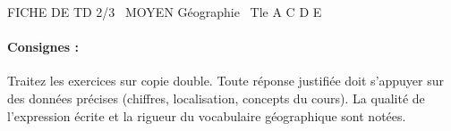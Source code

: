 \documentclass[11pt]{article}
\begin{document}
\begin{tcolorbox}[enhanced,colback=popink,colframe=popink,arc=10pt,boxrule=0pt,left=12pt,right=12pt,top=9pt,bottom=9pt]
{\color{white}\popxbold\small FICHE DE TD 2/3 \textbullet\ MOYEN \hfill Géographie \textbullet\ Tle A C D E\par}
\end{tcolorbox}
\vspace{4pt}
\paragraph{Consignes :} Traitez les exercices sur copie double. Toute réponse justifiée doit s'appuyer sur des données précises (chiffres, localisation, concepts du cours). La qualité de l'expression écrite et la rigueur du vocabulaire géographique sont notées.
\end{document}
